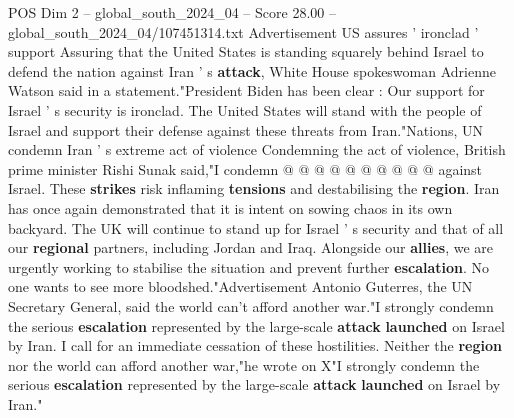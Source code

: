 \begin{textsample}{POS Dim 2 – global\_south\_2024\_04 – Score 28.00 – global\_south\_2024\_04/107451314.txt}
Advertisement US assures ' ironclad ' support Assuring that the United States is standing squarely behind Israel to defend the nation against Iran ' s \textbf{attack}, White House spokeswoman Adrienne Watson said in a statement."President Biden has been clear : Our support for Israel ' s security is ironclad.
The United States will stand with the people of Israel and support their defense against these threats from Iran."Nations, UN condemn Iran ' s extreme act of violence Condemning the act of violence, British prime minister Rishi Sunak said,"I condemn @ @ @ @ @ @ @ @ @ @ against Israel.
These \textbf{strikes} risk inflaming \textbf{tensions} and destabilising the \textbf{region}.
Iran has once again demonstrated that it is intent on sowing chaos in its own backyard.
The UK will continue to stand up for Israel ' s security and that of all our \textbf{regional} partners, including Jordan and Iraq.
Alongside our \textbf{allies}, we are urgently working to stabilise the situation and prevent further \textbf{escalation}.
No one wants to see more bloodshed."Advertisement Antonio Guterres, the UN Secretary General, said the world can't afford another war."I strongly condemn the serious \textbf{escalation} represented by the large-scale \textbf{attack} \textbf{launched} on Israel by Iran.
I call for an immediate cessation of these hostilities.
Neither the \textbf{region} nor the world can afford another war,"he wrote on X"I strongly condemn the serious \textbf{escalation} represented by the large-scale \textbf{attack} \textbf{launched} on Israel by Iran."

\end{textsample}

